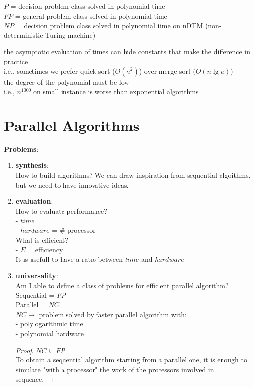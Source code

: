 $P$ = decision problem class solved in polynomial time\\
$FP$ = general problem class solved in polynomial time\\
$NP$ = decision problem class solved in polynomial time on nDTM (non-deterministic Turing machine)

\begin{remark}
 the asymptotic evaluation of times can hide constants that make the difference in practice\\
  i.e., sometimes we prefer quick-sort ($O(n^2)$) over merge-sort ($O(n\lg{n})$)\\
 the degree of the polynomial must be low\\
  i.e., $n^{1000}$ on small instance is worse than exponential algorithms\\
\end{remark}

\section{Parallel Algorithms}

\textbf{Problems}:

\begin{enumerate}
 \item \textbf{synthesis}:\\
  How to build algorithms? We can draw inspiration from sequential algoithms, but we need to have innovative ideas.
 \item \textbf{evaluation}:\\
 How to evaluate performance?\\
  - $time$\\
  - $hardware$ = \# processor\\
 What is efficient?\\
  - $E$ = efficiency\\
   It is usefull to have a ratio between $time$ and $hardware$
 \item \textbf{universality}: \\
  Am I able to define a class of problems for efficient parallel algorithm?\\
  Sequential = $FP$\\
  Parallel = $NC$\\
  $NC \rightarrow$ problem solved by faster parallel algorithm with:\\
   - polylogarithmic time\\
   - polynomial hardware
  \begin{proof}
  $NC \subseteq FP$\\
  To obtain a sequential algorithm starting from a parallel one, it is enough to simulate "with a processor" the work of the processors involved in sequence.
  \end{proof}
\end{enumerate}
